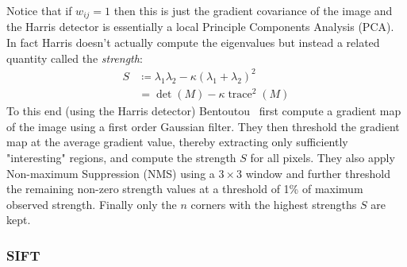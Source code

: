 Notice that if \(w_{ij} = 1\) then this is just the gradient covariance of the image and the Harris detector is essentially a local Principle Components Analysis (PCA).
%
In fact Harris doesn't actually compute the eigenvalues but instead a related quantity called the \textit{strength}:
\begin{align}
	S & \coloneqq \lambda_1 \lambda_2 - \kappa (\lambda_1 + \lambda_2)^2 \\
	  & = \det(M) - \kappa \operatorname{trace}^2(M)
	\label{eqn:strength}
\end{align}
%
To this end (using the Harris detector) Bentoutou \etal~first compute a gradient map of the image using a first order Gaussian filter.
%
They then threshold the gradient map at the average gradient value, thereby extracting only sufficiently "interesting" regions, and compute the strength \(S\) for all pixels.
%
They also apply Non-maximum Suppression (NMS) using a \(3 \times 3\) window and further threshold the remaining non-zero strength values at a threshold of 1\% of maximum observed strength.
%
Finally only the \(n\) corners with the highest strengths \(S\) are kept.

\subsubsection{SIFT}\label{sec:sift}

